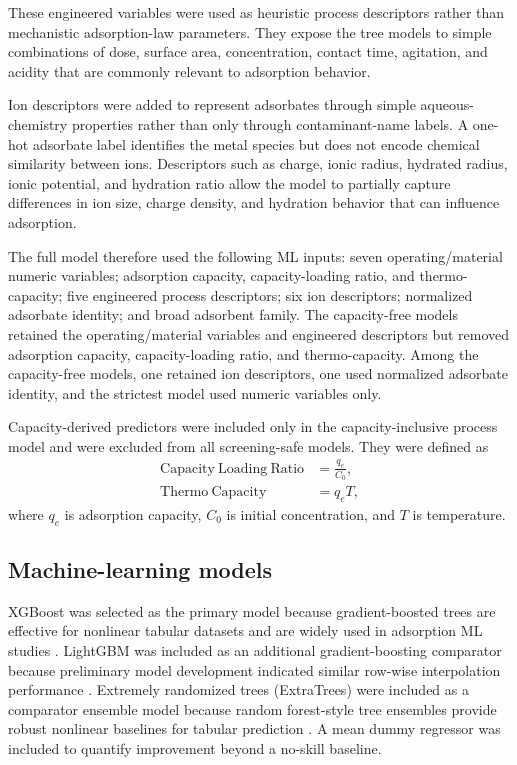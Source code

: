 \documentclass[review,12pt,number]{elsarticle}
\begin{document}
These engineered variables were used as heuristic process descriptors rather than mechanistic adsorption-law parameters. They expose the tree models to simple combinations of dose, surface area, concentration, contact time, agitation, and acidity that are commonly relevant to adsorption behavior.

Ion descriptors were added to represent adsorbates through simple aqueous-chemistry properties rather than only through contaminant-name labels. A one-hot adsorbate label identifies the metal species but does not encode chemical similarity between ions. Descriptors such as charge, ionic radius, hydrated radius, ionic potential, and hydration ratio allow the model to partially capture differences in ion size, charge density, and hydration behavior that can influence adsorption.

The full model therefore used the following ML inputs: seven operating/material numeric variables; adsorption capacity, capacity-loading ratio, and thermo-capacity; five engineered process descriptors; six ion descriptors; normalized adsorbate identity; and broad adsorbent family. The capacity-free models retained the operating/material variables and engineered descriptors but removed adsorption capacity, capacity-loading ratio, and thermo-capacity. Among the capacity-free models, one retained ion descriptors, one used normalized adsorbate identity, and the strictest model used numeric variables only.

Capacity-derived predictors were included only in the capacity-inclusive process model and were excluded from all screening-safe models. They were defined as
\begin{align}
\mathrm{Capacity\ Loading\ Ratio} &= \frac{q_e}{C_0}, \\
\mathrm{Thermo\ Capacity} &= q_e T,
\end{align}
where $q_e$ is adsorption capacity, $C_0$ is initial concentration, and $T$ is temperature.

\subsection{Machine-learning models}

XGBoost was selected as the primary model because gradient-boosted trees are effective for nonlinear tabular datasets and are widely used in adsorption ML studies \cite{chen2016,friedman2001}. LightGBM was included as an additional gradient-boosting comparator because preliminary model development indicated similar row-wise interpolation performance \cite{ke2017}. Extremely randomized trees (ExtraTrees) were included as a comparator ensemble model because random forest-style tree ensembles provide robust nonlinear baselines for tabular prediction \cite{breiman2001,geurts2006}. A mean dummy regressor was included to quantify improvement beyond a no-skill baseline.
\end{document}
